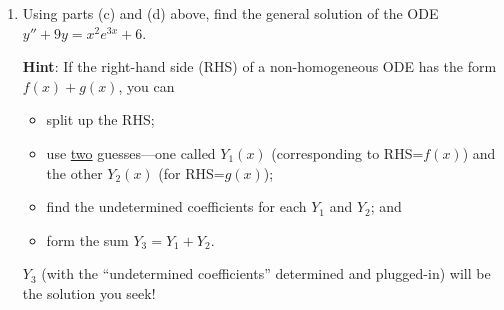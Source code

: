 \documentclass[12pt]{article}
\newcommand{\hint}[1]{\textbf{Hint}: #1}
\begin{document}
\begin{enumerate}
		\vspace{0.5in}
		
		\item Using parts (c) and (d) above, find the general solution of the ODE $y''+9y=x^2e^{3x}+6$.\par\vspace{1.5mm}\hint{If the right-hand side (RHS) of a non-homogeneous ODE has the form $f(x)+g(x)$, you can 
		\begin{itemize}[label=$\circ$,itemsep=0mm]\vspace{-1.5mm}
			\item split up the RHS;
			\item use \ul{two} guesses---one called $Y_1(x)$ (corresponding to RHS=$f(x)$) and the other $Y_2(x)$ (for RHS=$g(x)$); 
			\item find the undetermined coefficients for each $Y_1$ and $Y_2$; and
			\item form the sum $Y_3=Y_1+Y_2$.
		\end{itemize}
		$Y_3$ (with the ``undetermined coefficients'' determined and plugged-in) will be the solution you seek!}
		
		\newpage
		

\end{enumerate}
\end{document}
